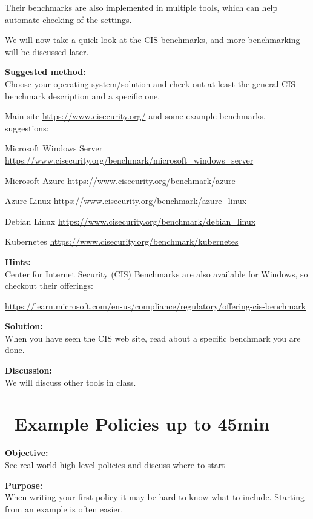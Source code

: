 \documentclass[a4paper,11pt,notitlepage]{report}
\begin{document}
Their benchmarks are also implemented in multiple tools, which can help automate checking of the settings.

We will now take a quick look at the CIS benchmarks, and more benchmarking will be discussed later.

{\bf Suggested method:}\\
Choose your operating system/solution and check out at least the general CIS benchmark description and a specific one.

Main site \url{https://www.cisecurity.org/} and some example benchmarks, suggestions:

\begin{list2}
\item Microsoft Windows Server   \url{https://www.cisecurity.org/benchmark/microsoft_windows_server}
\item Microsoft Azure https://www.cisecurity.org/benchmark/azure
\item Azure Linux \url{https://www.cisecurity.org/benchmark/azure_linux}
\item Debian Linux \url{https://www.cisecurity.org/benchmark/debian_linux}
\item Kubernetes \url{https://www.cisecurity.org/benchmark/kubernetes}
\end{list2}

{\bf Hints:}\\
Center for Internet Security (CIS) Benchmarks are also available for Windows, so checkout their offerings:

\url{https://learn.microsoft.com/en-us/compliance/regulatory/offering-cis-benchmark}


{\bf Solution:}\\
When you have seen the CIS web site, read about a specific benchmark you are done.


{\bf Discussion:}\\
We will discuss other tools in class.



\chapter{\faInfoCircle\ Example Policies up to 45min}
\label{ex:example-AUP}

{\bf Objective:}\\
See real world high level policies and discuss where to start

{\bf Purpose:}\\
When writing your first policy it may be hard to know what to include. Starting from an example is often easier.
\end{document}
